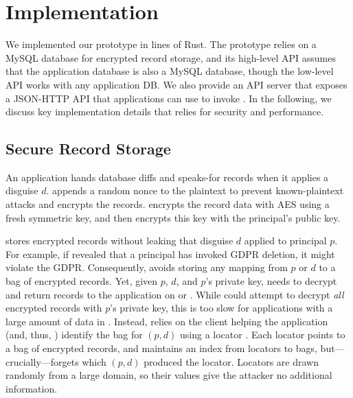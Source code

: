 \section{Implementation}
\label{s:impl}

%
We implemented our \sys prototype in  lines of Rust.
%
The prototype relies on a MySQL database for encrypted record storage, and
its high-level API assumes that the application database is also a MySQL
database, though the low-level API works with any application DB.
%
We also provide an API server that exposes a JSON-HTTP API that applications
can use to invoke \sys.
%
In the following, we discuss key implementation details that \sys relies for
security and performance.
%

\subsection{Secure Record Storage}
\label{s:impl-locators}
%
An application hands \sys database diffs and speaks-for records when it applies
a disguise $d$.
%
\sys appends a random nonce to the plaintext to prevent known-plaintext attacks
and encrypts the records.
%
\sys encrypts the record data with AES  using a fresh symmetric key, and then encrypts this key with the
principal's public key.
%

%
\sys stores encrypted records without leaking that disguise $d$ applied to
principal $p$.
%
For example, if \sys revealed that a principal has invoked GDPR deletion, it
might violate the GDPR.
%
Consequently, \sys avoids storing any mapping from $p$ or $d$ to a bag of
encrypted records.
%
Yet, given $p$, $d$, and $p$'s private key, \sys needs to decrypt and return
records to the application on  or .
%
While \sys could attempt to decrypt \emph{all} encrypted records with $p$'s
private key, this is too slow for applications with a large amount
of data in \sys.
%
Instead, \sys relies on the client helping the application (and, thus, \sys)
identify the bag for $(p, d)$ using a locator .
%
Each locator points to a bag of encrypted records, and \sys maintains an index
from locators to bags, but---crucially---forgets which $(p, d)$ produced the
locator.
%
Locators are drawn randomly from a large domain, so their values give
the attacker no additional information.
%

